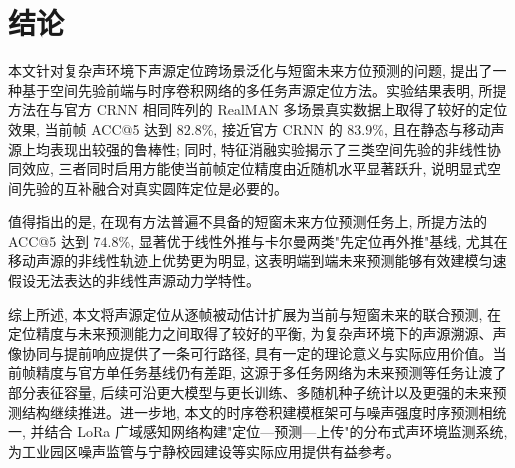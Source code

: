 \documentclass[lang=cn,a4paper,newtx]{elegantpaper}
\begin{document}
\section{结论}

本文针对复杂声环境下声源定位跨场景泛化与短窗未来方位预测的问题, 提出了一种基于空间先验前端与时序卷积网络的多任务声源定位方法。实验结果表明, 所提方法在与官方 CRNN 相同阵列的 RealMAN 多场景真实数据上取得了较好的定位效果, 当前帧 ACC@5 达到 $82.8\%$, 接近官方 CRNN 的 $83.9\%$, 且在静态与移动声源上均表现出较强的鲁棒性; 同时, 特征消融实验揭示了三类空间先验的非线性协同效应, 三者同时启用方能使当前帧定位精度由近随机水平显著跃升, 说明显式空间先验的互补融合对真实圆阵定位是必要的。

值得指出的是, 在现有方法普遍不具备的短窗未来方位预测任务上, 所提方法的 ACC@5 达到 $74.8\%$, 显著优于线性外推与卡尔曼两类"先定位再外推"基线, 尤其在移动声源的非线性轨迹上优势更为明显, 这表明端到端未来预测能够有效建模匀速假设无法表达的非线性声源动力学特性。

综上所述, 本文将声源定位从逐帧被动估计扩展为当前与短窗未来的联合预测, 在定位精度与未来预测能力之间取得了较好的平衡, 为复杂声环境下的声源溯源、声像协同与提前响应提供了一条可行路径, 具有一定的理论意义与实际应用价值。当前帧精度与官方单任务基线仍有差距, 这源于多任务网络为未来预测等任务让渡了部分表征容量, 后续可沿更大模型与更长训练、多随机种子统计以及更强的未来预测结构继续推进。进一步地, 本文的时序卷积建模框架可与噪声强度时序预测相统一, 并结合 LoRa 广域感知网络构建"定位—预测—上传"的分布式声环境监测系统, 为工业园区噪声监管与宁静校园建设等实际应用提供有益参考。

\printbibliography[heading=bibintoc, title=\ebibname]
\end{document}
